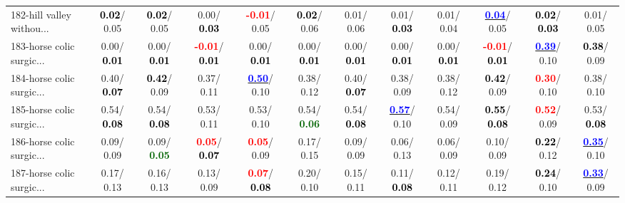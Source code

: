 \begin{table}[h]
\begin{center}
{\begin{tabular}{lc|c|c|c|c|c|c|c|c|c|c}
182-hill valley withou... & \textcolor{black}{\textbf{  0.02}}/  0.05 & \textcolor{black}{\textbf{  0.02}}/  0.05 &   0.00/\textcolor{black}{\textbf{  0.03}} & \textcolor{red}{\textbf{ -0.01}}/  0.05 & \textcolor{black}{\textbf{  0.02}}/  0.06 &   0.01/  0.06 &   0.01/\textcolor{black}{\textbf{  0.03}} &   0.01/  0.04 & \underline{\textcolor{blue}{\textbf{  0.04}}}/  0.05 & \textcolor{black}{\textbf{  0.02}}/\textcolor{black}{\textbf{  0.03}} &   0.01/  0.05 \\
183-horse colic surgic... &   0.00/\textcolor{black}{\textbf{  0.01}} &   0.00/\textcolor{black}{\textbf{  0.01}} & \textcolor{red}{\textbf{ -0.01}}/\textcolor{black}{\textbf{  0.01}} &   0.00/\textcolor{black}{\textbf{  0.01}} &   0.00/\textcolor{black}{\textbf{  0.01}} &   0.00/\textcolor{black}{\textbf{  0.01}} &   0.00/\textcolor{black}{\textbf{  0.01}} &   0.00/\textcolor{black}{\textbf{  0.01}} & \textcolor{red}{\textbf{ -0.01}}/\textcolor{black}{\textbf{  0.01}} & \underline{\textcolor{blue}{\textbf{  0.39}}}/  0.10 & \textcolor{black}{\textbf{  0.38}}/  0.09 \\
184-horse colic surgic... &   0.40/\textcolor{black}{\textbf{  0.07}} & \textcolor{black}{\textbf{  0.42}}/  0.09 &   0.37/  0.11 & \underline{\textcolor{blue}{\textbf{  0.50}}}/  0.10 &   0.38/  0.12 &   0.40/\textcolor{black}{\textbf{  0.07}} &   0.38/  0.09 &   0.38/  0.12 & \textcolor{black}{\textbf{  0.42}}/  0.09 & \textcolor{red}{\textbf{  0.30}}/  0.10 &   0.38/  0.10 \\
185-horse colic surgic... &   0.54/\textcolor{black}{\textbf{  0.08}} &   0.54/\textcolor{black}{\textbf{  0.08}} &   0.53/  0.11 &   0.53/  0.10 &   0.54/\textcolor{darkgreen}{\textbf{  0.06}} &   0.54/\textcolor{black}{\textbf{  0.08}} & \underline{\textcolor{blue}{\textbf{  0.57}}}/  0.10 &   0.54/  0.09 & \textcolor{black}{\textbf{  0.55}}/\textcolor{black}{\textbf{  0.08}} & \textcolor{red}{\textbf{  0.52}}/  0.09 &   0.53/\textcolor{black}{\textbf{  0.08}} \\
186-horse colic surgic... &   0.09/  0.09 &   0.09/\textcolor{darkgreen}{\textbf{  0.05}} & \textcolor{red}{\textbf{  0.05}}/\textcolor{black}{\textbf{  0.07}} & \textcolor{red}{\textbf{  0.05}}/  0.09 &   0.17/  0.15 &   0.09/  0.09 &   0.06/  0.13 &   0.06/  0.09 &   0.10/  0.09 & \textcolor{black}{\textbf{  0.22}}/  0.12 & \underline{\textcolor{blue}{\textbf{  0.35}}}/  0.10 \\
187-horse colic surgic... &   0.17/  0.13 &   0.16/  0.13 &   0.13/  0.09 & \textcolor{red}{\textbf{  0.07}}/\textcolor{black}{\textbf{  0.08}} &   0.20/  0.10 &   0.15/  0.11 &   0.11/\textcolor{black}{\textbf{  0.08}} &   0.12/  0.11 &   0.19/  0.12 & \textcolor{black}{\textbf{  0.24}}/  0.10 & \underline{\textcolor{blue}{\textbf{  0.33}}}/  0.09 \\

\end{tabular}}
\end{center}
\end{table}
